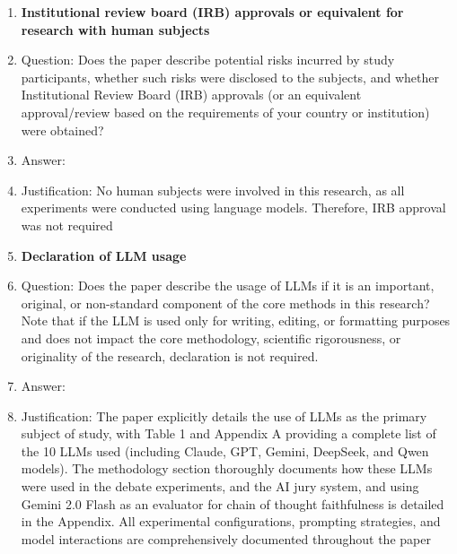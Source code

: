 \documentclass{article}
\begin{document}
\begin{enumerate}
\item {\bf Institutional review board (IRB) approvals or equivalent for research with human subjects}
    \item[] Question: Does the paper describe potential risks incurred by study participants, whether such risks were disclosed to the subjects, and whether Institutional Review Board (IRB) approvals (or an equivalent approval/review based on the requirements of your country or institution) were obtained?
    \item[] Answer: \answerNA{} %
    \item[] Justification: No human subjects were involved in this research, as all experiments were conducted using language models. Therefore, IRB approval was not required

\item {\bf Declaration of LLM usage}
    \item[] Question: Does the paper describe the usage of LLMs if it is an important, original, or non-standard component of the core methods in this research? Note that if the LLM is used only for writing, editing, or formatting purposes and does not impact the core methodology, scientific rigorousness, or originality of the research, declaration is not required.
    \item[] Answer: \answerYes{} %
    \item[] Justification: The paper explicitly details the use of LLMs as the primary subject of study, with Table 1 and Appendix A providing a complete list of the 10 LLMs used (including Claude, GPT, Gemini, DeepSeek, and Qwen models). The methodology section thoroughly documents how these LLMs were used in the debate experiments, and the AI jury system, and using Gemini 2.0 Flash as an evaluator for chain of thought faithfulness is detailed in the Appendix. All experimental configurations, prompting strategies, and model interactions are comprehensively documented throughout the paper

\end{enumerate}
\end{document}

